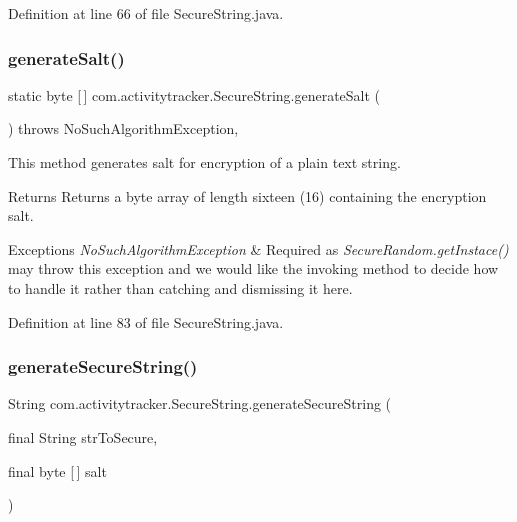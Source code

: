 Definition at line 66 of file Secure\+String.\+java.

\mbox{\label{classcom_1_1activitytracker_1_1_secure_string_a1907ad109bb5e64291fabd3ff459ef49}} 
\subsubsection{\texorpdfstring{generate\+Salt()}{generateSalt()}}
{\footnotesize\ttfamily static byte \mbox{[}$\,$\mbox{]} com.\+activitytracker.\+Secure\+String.\+generate\+Salt (\begin{DoxyParamCaption}{ }\end{DoxyParamCaption}) throws No\+Such\+Algorithm\+Exception\hspace{0.3cm}{\ttfamily [static]}, {\ttfamily [private]}}

This method generates salt for encryption of a plain text string.

\begin{DoxyReturn}{Returns}
Returns a byte array of length sixteen (16) containing the encryption salt.
\end{DoxyReturn}

\begin{DoxyExceptions}{Exceptions}
{\em No\+Such\+Algorithm\+Exception} & Required as {\itshape Secure\+Random.\+get\+Instace()} may throw this exception and we would like the invoking method to decide how to handle it rather than catching and dismissing it here. \\
\hline
\end{DoxyExceptions}


Definition at line 83 of file Secure\+String.\+java.

\mbox{\label{classcom_1_1activitytracker_1_1_secure_string_aa2521591ab15fb4c5a2461c04b08320f}} 
\subsubsection{\texorpdfstring{generate\+Secure\+String()}{generateSecureString()}}
{\footnotesize\ttfamily String com.\+activitytracker.\+Secure\+String.\+generate\+Secure\+String (\begin{DoxyParamCaption}\item[{final String}]{str\+To\+Secure,  }\item[{final byte \mbox{[}$\,$\mbox{]}}]{salt }\end{DoxyParamCaption})\hspace{0.3cm}{\ttfamily [private]}}

